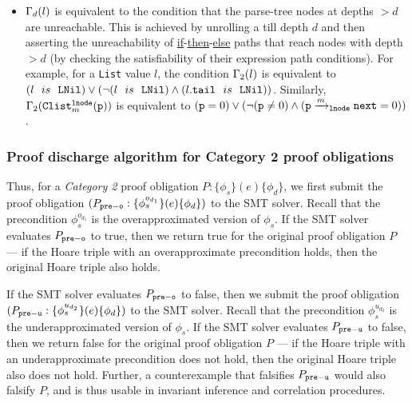 \begin{itemize}

\item $\Gamma_d(l)$ is equivalent to the condition
that the parse-tree nodes at depths
$>d$ are unreachable. This is achieved by unrolling a \recursiveRelation{}
till depth $d$ and then asserting the unreachability
of
\underline{if}-\underline{then}-\underline{else}
paths that reach nodes with depth $>d$ (by checking the
satisfiability of their expression path conditions).
For example, for a {\tt List} value $l$,
the condition
$\Gamma_2(l)$ is equivalent to
$(l\ \ is\ \ {\tt LNil}) \vee (\neg(l\ \ is\ \ {\tt LNil})\land(l{\tt .tail}\ \ is\ \ {\tt LNil}))$.
Similarly,
$\Gamma_2({\tt Clist}^{{\tt lnode}}_{m}({\tt p}))$
is equivalent to
$({\tt p}=0) \vee (\neg({\tt p}\neq 0)\land({\tt p}\xrightarrow[]{m}_{{\tt lnode}}\mathrm{\tt next}=0))$.
\end{itemize}

\subsubsection{Proof discharge algorithm for Category 2 proof obligations}
\label{sec:cat2algo}
Thus, for a {\em Category 2} proof obligation
$P: \{\phi_s\} (e) \{\phi_d\}$, we first
submit the proof obligation
$(P_{{\tt pre-o}}: \{\phi^{o_{d_1}}_s\} (e) \{\phi_d\})$
to the SMT solver. Recall that the precondition $\phi^{o_{d_1}}_s$
is the overapproximated version
of $\phi_s$.
If the SMT solver evaluates
$P_{{\tt pre-o}}$ to true, then we return true for
the original proof obligation $P$ --- if the
Hoare triple with an overapproximate precondition
holds, then the original Hoare triple
also holds.

If the
SMT solver evaluates
$P_{{\tt pre-o}}$ to false, then we submit
the proof obligation
$(P_{{\tt pre-u}}: \{\phi^{u_{d_2}}_s\} (e) \{\phi_d\})$
to the SMT solver. Recall that the precondition $\phi^{u_{d_2}}_s$
is the underapproximated version of $\phi_s$.
If the SMT solver evaluates
$P_{{\tt pre-u}}$ to false, then we return false for
the original proof obligation $P$ --- if the
Hoare triple with an underapproximate precondition
does not hold, then the original Hoare triple
also does not hold. Further, a counterexample that
falsifies $P_{{\tt pre-u}}$ would also falsify $P$,
and is thus usable in invariant inference and correlation procedures.

